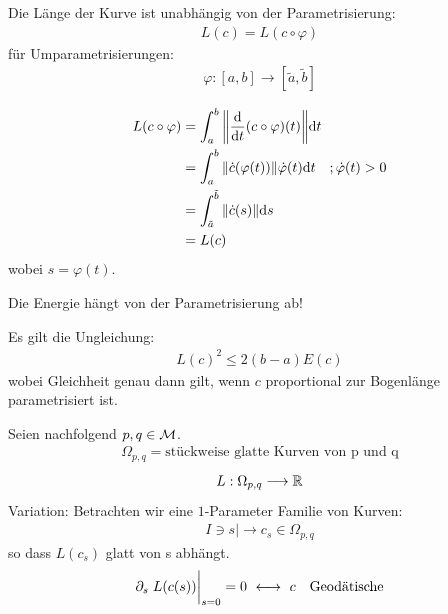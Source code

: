 \begin{bem}
Die Länge der Kurve ist unabhängig von der Parametrisierung:
\begin{align}
L(c) = L(c \circ \varphi)
\end{align}
für Umparametrisierungen:
\begin{align*}
\varphi: [a, b] \longrightarrow [\tilde{a}, \tilde{b}]
\end{align*}
\end{bem}
\begin{bew}
\begin{align*}
L(c \circ \varphi) &= \int_{a}^{b} \norm{\frac{\dd}{\dd t} (c \circ \varphi)(t)} \dd t \\
&= \int_{a}^{b} \norm{\dot{c}(\varphi(t))} \dot{\varphi}(t) \dd t \quad ;\dot{\varphi}(t) > 0 \\
&= \int_{\tilde{a}}^{\tilde{b}} \norm{\dot{c}(s)} \dd s \\
&= L(c)
\end{align*}
wobei $s=\varphi(t)$.
\end{bew}
\begin{bem}
Die Energie hängt von der Parametrisierung ab!
\end{bem}
\begin{lem}
Es gilt die Ungleichung:
\begin{align}
L(c)^2 \leq 2(b-a)E(c)
\end{align}
wobei Gleichheit genau dann gilt, wenn $c$ proportional zur Bogenlänge parametrisiert ist.
\end{lem}
Seien nachfolgend $p, q \in \mathcal{M}$. 
\begin{align*}
\Omega_{p, q} = {\text{stückweise glatte Kurven von p und q}}
\end{align*} 
\begin{align*}
L: \Omega_{p, q} \longrightarrow \mathbb{R}
\end{align*}
Variation:
Betrachten wir eine $1$-Parameter Familie von Kurven:
\begin{align*}
I \ni s |\longrightarrow c_s \in \Omega_{p, q}
\end{align*}
so dass $L(c_s)$ glatt von s abhängt.
\begin{align*}
\partial_s\eval{L(c(s))}_{s=0} = 0 \  \longleftrightarrow \ c \quad \text{Geodätische}
\end{align*}

